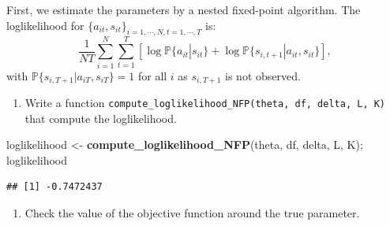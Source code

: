 \documentclass[]{book}
\newenvironment{Shaded}{\begin{snugshade}}{\end{snugshade}}
\newcommand{\KeywordTok}[1]{\textcolor[rgb]{0.13,0.29,0.53}{\textbf{#1}}}
\newcommand{\StringTok}[1]{\textcolor[rgb]{0.31,0.60,0.02}{#1}}
\newcommand{\NormalTok}[1]{#1}
\providecommand{\tightlist}{%
  \setlength{\itemsep}{0pt}\setlength{\parskip}{0pt}}
\begin{document}
First, we estimate the parameters by a nested fixed-point algorithm. The
loglikelihood for
\(\{a_{it}, s_{it}\}_{i = 1, \cdots, N, t = 1, \cdots, T}\) is: \[
\frac{1}{NT} \sum_{i = 1}^N \sum_{t = 1}^T[\log\mathbb{P}\{a_{it}|s_{it}\} + \log \mathbb{P}\{s_{i, t + 1}|a_{it}, s_{it}\}],
\] with \(\mathbb{P}\{s_{i, T + 1}|a_{iT}, s_{iT}\} = 1\) for all \(i\)
as \(s_{i, T + 1}\) is not observed.

\begin{enumerate}
\def\labelenumi{\arabic{enumi}.}
\setcounter{enumi}{1}
\tightlist
\item
  Write a function
  \texttt{compute\_loglikelihood\_NFP(theta,\ df,\ delta,\ L,\ K)} that
  compute the loglikelihood.
\end{enumerate}

\begin{Shaded}
\begin{Highlighting}[]
\NormalTok{loglikelihood <-}\StringTok{ }\KeywordTok{compute_loglikelihood_NFP}\NormalTok{(theta, df, delta, L, K); loglikelihood}
\end{Highlighting}
\end{Shaded}

\begin{verbatim}
## [1] -0.7472437
\end{verbatim}

\begin{enumerate}
\def\labelenumi{\arabic{enumi}.}
\setcounter{enumi}{2}
\tightlist
\item
  Check the value of the objective function around the true parameter.
\end{enumerate}
\end{document}

